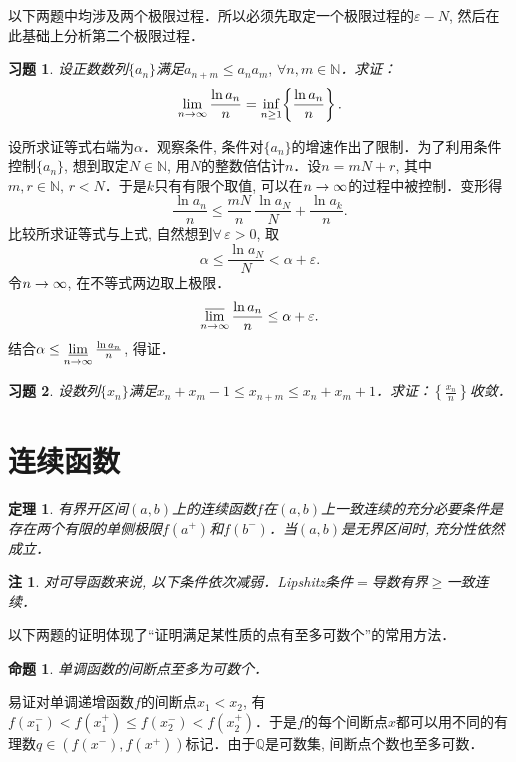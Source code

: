 \documentclass[11pt,a4paper]{ctexart}
\makeatletter
\theoremstyle{thmseries} %
\newtheorem{thm}{定理}[section]
\newtheorem{prop}{命题}[section]
\theoremstyle{exerseries}
\newtheorem{exer}{习题}[section]
\newtheorem*{rem}{注}
\renewenvironment{proof}[1][\proofname]{\par
  \pushQED{\qed}%
  \normalfont \topsep6\p@\@plus6\p@\relax
  \trivlist
  \item[\hskip\labelsep
        \itshape
    #1\@addpunct{}]\ignorespaces
}{%
  \popQED\endtrivlist\@endpefalse
}
\newenvironment{pf}{\begin{proof}[\bfseries\upshape 证\quad]}{\end{proof}}
\newcommand{\bra}[1]{\mathopen{}\left(#1\right)}
\newcommand{\cbra}[1]{\mathopen{}\left\{#1\right\}}
\renewcommand{\epsilon}{\varepsilon}
\newcommand{\N}{\mathbb{N}}
\newcommand{\Q}{\mathbb{Q}}
\def \nti {\mathnormal{n}\to\infty}
\DeclareMathOperator{\llim}{\underset{\nti}{\underline{\lim}}}
\DeclareMathOperator{\ulim}{\underset{\nti}{\overline{\lim}}}
\makeatother
\begin{document}
以下两题中均涉及两个极限过程．所以必须先取定一个极限过程的$\epsilon-N$, 然后在此基础上分析第二个极限过程．
\begin{exer}
	设正数数列$\{a_n\}$满足$a_{n+m}\leq a_na_m,\,\forall n,m\in\N$．求证：
	\[\lim_{\nti}\frac{\ln a_n}{n}=\inf_{n\geq 1}\cbra{\frac{\ln a_n}{n}}.\]
\end{exer}
\begin{pf}
	设所求证等式右端为$\alpha$．观察条件, 条件对$\{a_n\}$的增速作出了限制．为了利用条件控制$\{a_n\}$, 想到取定$N\in\N$, 用$N$的整数倍估计$n$．设$n=mN+r$, 其中$m,r\in\N,\,r<N$．于是$k$只有有限个取值, 可以在$\nti$的过程中被控制．变形得
	\[\frac{\ln a_n}{n}\leq\frac{mN}{n}\,\frac{\ln a_N}{N}+\frac{\ln a_k}{n}.\]
	比较所求证等式与上式, 自然想到$\forall\,\epsilon>0$, 取
	\[\alpha\leq\frac{\ln a_N}{N}<\alpha+\epsilon.\]
	令$\nti$, 在不等式两边取上极限．
	\[\ulim\frac{\ln a_n}{n}\leq\alpha+\epsilon.\]
	结合$\alpha\leq\llim\frac{\ln a_n}{n}$, 得证．
\end{pf}

\begin{exer}
	设数列$\{x_n\}$满足$x_n+x_m-1\leq x_{n+m}\leq x_n+x_m+1$．求证：$\cbra{\frac{x_n}{n}}$收敛．
\end{exer}


\section{连续函数}
\begin{thm}
	有界开区间$(a,b)$上的连续函数$f$在$(a,b)$上一致连续的充分必要条件是存在两个有限的单侧极限$f(a^+)$和$f(b^-)$．当$(a,b)$是无界区间时, 充分性依然成立．
\end{thm}
\begin{rem}
	对可导函数来说, 以下条件依次减弱．Lipshitz条件$=$导数有界$\geq$一致连续．
\end{rem}


以下两题的证明体现了``证明满足某性质的点有至多可数个''的常用方法．
\begin{prop}
	单调函数的间断点至多为可数个．
\end{prop}
\begin{pf}
	易证对单调递增函数$f$的间断点$x_1<x_2$, 有$f(x_1^-)<f(x_1^+)\leq f(x_2^-)<f(x_2^+)$．于是$f$的每个间断点$x$都可以用不同的有理数$q\in\bra{f(x^-),f(x^+)}$标记．由于$\Q$是可数集, 间断点个数也至多可数．
\end{pf}
\end{document}
